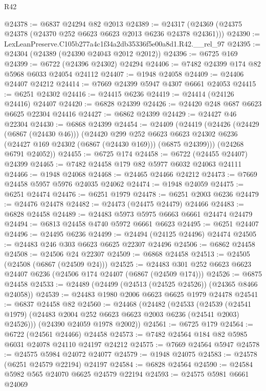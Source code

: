 \begin{lexlean}{R42}
\begin{coremodule}
{@24378 := @6837 @24294 @82 @2013
@24389 := @24317 (@24369 (@24375 @24378 (@24370 @252 @6623 @6623 @2013 @6236 @24378 @24361)))
@24390 := LexLeanPreserve.C105b277a4c1f34a2db35336f5e00a8d1.R42.__rel_97
@24395 := @24304 (@24389 (@24390 @24043 @2012 @2012))
@24396 := @6725 @169
@24399 := @6722 (@24396 @24302) @24294
@24406 := @7482 @24399 @174 @82 @5968 @6033 @24054 @24112
@24407 := @1948 @24058
@24409 := @24406 @24407 @24212
@24414 := @7669 @24399 @5947 @4307 @6661 @24053
@24415 := @6251 @24302
@24416 := @24415 @6236
@24419 := @24414 (@24126 @24416) @24407
@24420 := @6828 @24399
@24426 := @24420 @248 @687 @6623 @6625 @22304 @24416
@24427 := @6862 @24399
@24429 := @24427 @46 @22304
@24430 := @6868 @24399
@24454 := @24409
    (@24419
      (@24426
        (@24429 (@6867 (@24430 @46)))
        (@24420
          @299
          @252
          @6623
          @6623
          @24302
          @6236
          (@24427 @169 @24302 (@6867 (@24430 @169)))
          (@6875 @24399)))
      (@24268 @6791 @24052))
@24455 := @6725 @174
@24458 := @6722 (@24455 @24407) @24399
@24465 := @7482 @24458 @179 @82 @5977 @6032 @24063 @24111
@24466 := @1948 @24068
@24468 := @24465 @24466 @24212
@24473 := @7669 @24458 @5957 @5976 @24035 @24062
@24474 := @1948 @24059
@24475 := @6251 @24474
@24476 := @6251 @1979
@24478 := @6251 @2003 @6236
@24479 := @24476 @24478
@24482 := @24473 (@24475 @24479) @24466
@24483 := @6828 @24458
@24489 := @24483 @5973 @5975 @6663 @6661 @24474 @24479
@24494 := @6813 @24458 @4740 @5972 @6661 @6623
@24495 := @6251 @24407
@24496 := @24495 @6236
@24499 := @24494 (@24125 @24496) @24474
@24505 := @24483 @246 @303 @6623 @6625 @22307 @24496
@24506 := @6862 @24458
@24508 := @24506 @24 @22307
@24509 := @6868 @24458
@24513 := @24505 (@24508 (@6867 (@24509 @24)))
@24525 := @24483 @301 @252 @6623 @6623 @24407 @6236 (@24506 @174 @24407 (@6867 (@24509 @174)))
@24526 := @6875 @24458
@24533 := @24489 (@24499 (@24513 (@24525 @24526)) (@24365 @8466 @24058))
@24539 := @24483 @1980 @2006 @6623 @6625 @1979 @24478
@24541 := @6837 @24458 @82
@24560 := @24468
    (@24482
      (@24533
        (@24539 (@24541 @1979) (@24483 @2004 @252 @6623 @6623 @2003 @6236 (@24541 @2003) @24526)))
      (@24390 @24059 @1978 @2002))
@24561 := @6725 @179
@24564 := @6722 (@24561 @24466) @24458
@24573 := @7482 @24564 @184 @82 @5985 @6031 @24078 @24110 @24197 @24212
@24575 := @7669 @24564 @5947
@24578 := @24575 @5984 @24072 @24077
@24579 := @1948 @24075
@24583 := @24578 (@6251 @24579 @22194) @24197
@24584 := @6828 @24564
@24590 := @24584 @5982 @565 @24070 @6625 @24579 @22194
@24593 := @24575 @5981 @6661 @24069
}
\end{coremodule}
\end{lexlean}
